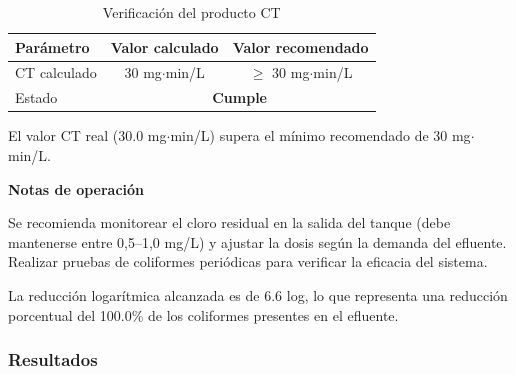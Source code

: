 \documentclass[12pt,a4paper]{article}
\begin{document}
\begin{table}[H]
\centering
\caption{Verificación del producto CT}
\begin{tabular}{@{}lcc@{}}
\toprule
\textbf{Parámetro} & \textbf{Valor calculado} & \textbf{Valor recomendado} \\
\midrule
CT calculado & 30 mg$\cdot$min/L & $\geq$ 30 mg$\cdot$min/L \\
Estado & \multicolumn{2}{c}{\textbf{Cumple}} \\
\bottomrule
\end{tabular}
\end{table}

El valor CT real (30.0 mg$⋅$min/L) supera el mínimo recomendado de 30 mg$⋅$min/L.


\textbf{Notas de operación}

Se recomienda monitorear el cloro residual en la salida del tanque (debe mantenerse entre 0,5--1,0 mg/L) y ajustar la dosis según la demanda del efluente. Realizar pruebas de coliformes periódicas para verificar la eficacia del sistema.

La reducción logarítmica alcanzada es de 6.6 log, lo que representa una reducción porcentual del 100.0\% de los coliformes presentes en el efluente.

\subsubsection{Resultados}
\end{document}
